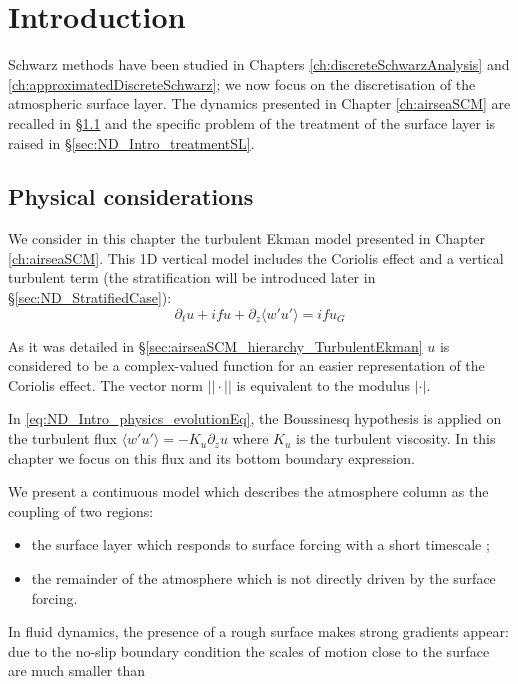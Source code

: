\section{Introduction}
Schwarz methods have been studied in Chapters
\ref{ch:discreteSchwarzAnalysis} and
\ref{ch:approximatedDiscreteSchwarz}; we now focus
on the discretisation of the atmospheric surface layer.
The dynamics presented in Chapter \ref{ch:airseaSCM} are
recalled in \S \ref{sec:ND_Intro_continuousModel} and
the specific problem of the treatment of the surface layer
is raised in \S \ref{sec:ND_Intro_treatmentSL}.
\subsection{Physical considerations}
\label{sec:ND_Intro_continuousModel}
We consider in this chapter the turbulent Ekman model presented
in Chapter \ref{ch:airseaSCM}.
This 1D vertical model includes the Coriolis effect
and a vertical turbulent term (the stratification
will be introduced later in \S\ref{sec:ND_StratifiedCase}):
\begin{equation}
	\label{eq:ND_Intro_physics_evolutionEq}
	\partial_t u + i f u + \partial_z \langle w'u'\rangle
	= i f u_G 
\end{equation}
\begin{remark}
As it was detailed in \S \ref{sec:airseaSCM_hierarchy_TurbulentEkman}
$u$ is considered to be a complex-valued function for an easier
representation of the Coriolis effect.
The vector norm $||\cdot||$ is equivalent to the modulus
$|\cdot|$.
\end{remark}
In \eqref{eq:ND_Intro_physics_evolutionEq}, the
Boussinesq hypothesis is applied on the turbulent flux
$\langle w'u' \rangle = - K_u \partial_z u$ where
$K_u$ is the turbulent viscosity.
In this chapter we focus on this flux and its bottom boundary
expression.
\par
We present a continuous model which describes the atmosphere
column as the coupling of two regions:
\begin{itemize}
	\item the surface layer which responds to surface
	forcing with a short timescale \citep{lemone_100_2019};
	\item the remainder of the atmosphere which is
		not directly driven by the surface forcing.
\end{itemize}
In fluid dynamics, the presence of a rough surface makes strong
gradients appear:
due to the no-slip boundary condition
the scales of motion close to the surface are much smaller than
